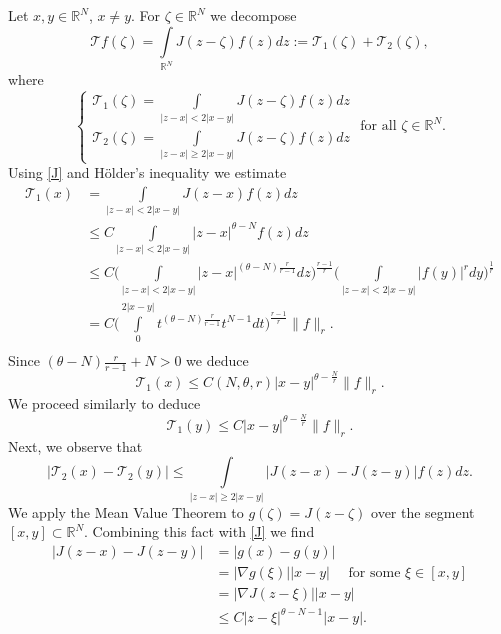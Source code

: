 \documentclass[leqno,12pt]{article}
\newcommand{\ds}{\displaystyle}
\newcommand{\intl}{\int\limits}
\newcommand{\R}{\mathbb R}
\numberwithin{equation}{section}
\begin{document}
Let $x, y\in \R^N$, $x\neq y$. For $\zeta\in \R^N$ we decompose
$$
\mathcal{T}f(\zeta)=\intl_{\R^N}J(z-\zeta)f(z) dz :=\mathcal{T}_1(\zeta)+\mathcal{T}_2(\zeta),
$$
where
$$
\begin{cases}
\ds\mathcal{T}_1(\zeta)=\intl_{|z-x|<2|x-y|}J(z-\zeta)f(z) dz\\[0.4in]
\ds \mathcal{T}_2(\zeta)=\intl_{|z-x|\geq 2|x-y|} J(z-\zeta)f(z) dz
\end{cases}
\mbox{ for all }\zeta\in \R^N.
$$
Using \eqref{J} and H\"older's inequality we estimate
$$
\begin{aligned}
\mathcal{T}_1(x) &=\intl_{|z-x|<2|x-y|}J(z-x)f(z) dz\\
&\leq C \intl_{|z-x|<2|x-y|} |z-x|^{\theta-N} f(z) dz\\
&\leq C \biggl(\intl_{|z-x|<2|x-y|}\big|z-x\big|^{(\theta-N)\frac{r}{r-1}} dz\biggl)^{\frac{r-1}{r}}  \biggl(\intl_{|z-x|<2|x-y|}|f(y)|^r dy\biggl)^{\frac{1}{r}} \\[0.1cm]
&= C\biggl(\intl_{0}^{2|x-y|}t^{(\theta-N) \frac{r}{r-1}}  t^{N-1} dt\biggl)^{\frac{r-1}{r}}  \|f\|_r.\\
\end{aligned}
$$
Since $(\theta-N)\frac{r}{r-1}+N >0$ we deduce
\begin{equation}\label{e1}
\mathcal{T}_1(x)\leq C(N, \theta, r) \big|x-y\big|^{\theta-\frac{N}{r}}\|f\|_r.
\end{equation}
We proceed similarly to deduce
\begin{equation}\label{e2}
\mathcal{T}_1(y)\leq C\big|x-y\big|^{\theta-\frac{N}{r}}\|f\|_r.
\end{equation}
Next, we observe that
\begin{equation}\label{e3}
|\mathcal{T}_2(x)-\mathcal{T}_2(y)|\leq \intl_{|z-x|\geq 2|x-y|} \big|J(z-x)-J(z-y)\big|f(z) dz.
\end{equation}
We apply the Mean Value Theorem to $g(\zeta)=J(z-\zeta)$ over the segment $[x,y]\subset \R^N$. Combining this fact with \eqref{J} we find 
\begin{equation}\label{e4}
\begin{aligned}
\big|J(z-x)-J(z-y)\big|&=|g(x)-g(y)|\\
&=|\nabla g(\xi)||x-y|\quad\mbox{ for some }\xi \in [x,y]\\
&=|\nabla J(z-\xi)||x-y|\\
&\leq C|z-\xi|^{\theta-N-1}|x-y|.
\end{aligned}
\end{equation}
\end{document}
